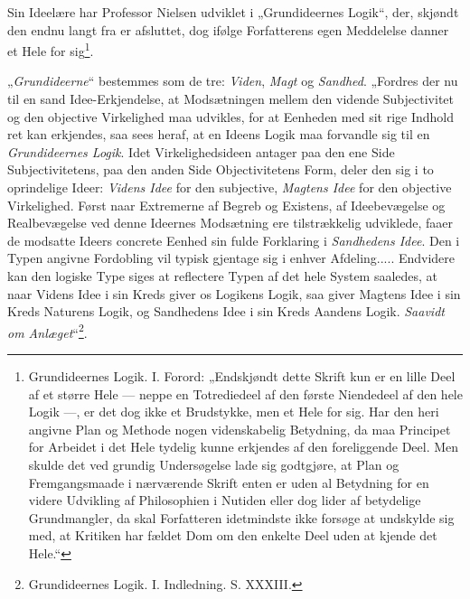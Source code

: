 \documentclass[12pt,a4paper]{book}
\newcommand{\opage}[1]{\marginnote{\footnotesize\textit{[#1]}}}
\begin{document}
Sin Ideelære har Professor Nielsen udviklet i
„Grundideernes Logik“, der, skjøndt den endnu langt fra
er afsluttet, dog ifølge Forfatterens egen Meddelelse
danner et Hele for sig\footnote{Grundideernes Logik. I. Forord: „Endskjøndt dette Skrift
kun er en lille Deel af et større Hele --- neppe en Totrediedeel
af den første Niendedeel af den hele Logik ---, er det
dog ikke et Brudstykke, men et Hele for sig. Har den heri
angivne Plan og Methode nogen videnskabelig Betydning,
da maa Principet for Arbeidet i det Hele tydelig kunne erkjendes
af den foreliggende Deel. Men skulde det ved grundig
Undersøgelse lade sig godtgjøre, at Plan og Fremgangsmaade
i nærværende Skrift enten er uden al Betydning for
en videre Udvikling af Philosophien i Nutiden eller dog
lider af betydelige Grundmangler, da skal Forfatteren idetmindste
ikke forsøge at undskylde sig med, at Kritiken har
fældet Dom om den enkelte Deel uden at kjende det Hele.“}.

\opage{40}\setcounter{footnote}{0}%
„\emph{Grundideerne}“ bestemmes som de tre: \emph{Viden},
\emph{Magt} og \emph{Sandhed}. „Fordres der nu til en sand
Idee-Erkjendelse, at Modsætningen mellem den vidende
Subjectivitet og den objective Virkelighed maa udvikles,
for at Eenheden med sit rige Indhold ret kan erkjendes,
saa sees heraf, at en Ideens Logik maa forvandle sig til
en \emph{Grundideernes Logik}. Idet Virkelighedsideen
antager paa den ene Side Subjectivitetens, paa den anden
Side Objectivitetens Form, deler den sig i to oprindelige
Ideer: \emph{Videns Idee} for den subjective,
\emph{Magtens Idee} for den objective Virkelighed. Først
naar Extremerne af Begreb og Existens, af Ideebevægelse
og Realbevægelse ved denne Ideernes Modsætning
ere tilstrækkelig udviklede, faaer de modsatte Ideers concrete
Eenhed sin fulde Forklaring i \emph{Sandhedens Idee}.
Den i Typen angivne Fordobling vil typisk gjentage sig
i enhver Afdeling..... Endvidere kan den logiske
Type siges at reflectere Typen af det hele System saaledes,
at naar Videns Idee i sin Kreds giver os Logikens
Logik, saa giver Magtens Idee i sin Kreds Naturens
Logik, og Sandhedens Idee i sin Kreds Aandens
Logik. \emph{Saavidt om Anlæget}“\footnote{Grundideernes Logik. I. Indledning. S. XXXIII.}.
\end{document}
